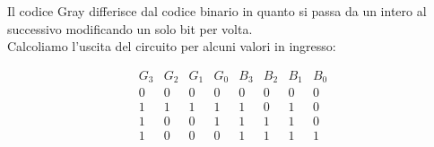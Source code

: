 \documentclass[10pt, a4paper, italian]{article}
\begin{document}
Il codice Gray differisce dal codice binario in quanto si passa da un intero al successivo modificando un solo bit per volta.\\
Calcoliamo l'uscita del circuito per alcuni valori in ingresso:
\begin{table}[htbp]
    \centering
    \[
    \begin{array}{cccc|cccc}
        G_3 & G_2 & G_1 & G_0 & B_3 & B_2 & B_1 & B_0\\
        \hline
        0 & 0 & 0 & 0 & 0 & 0 & 0 & 0\\
        1 & 1 & 1 & 1 & 1 & 0 & 1 & 0\\
        1 & 0 & 0 & 1 & 1 & 1 & 1 & 0\\
        1 & 0 & 0 & 0 & 1 & 1 & 1 & 1\\
    \end{array}
    \]
\end{table}
\end{document}
